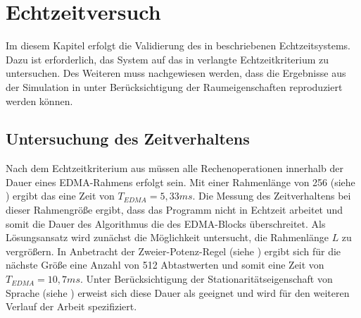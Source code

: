 \chapter{Echtzeitversuch}
\label{chap:Echtzeitversuch}
Im diesem Kapitel erfolgt die Validierung des in  beschriebenen Echtzeitsystems. Dazu ist erforderlich, das System auf das in  verlangte Echtzeitkriterium zu untersuchen. Des Weiteren muss nachgewiesen werden, dass die Ergebnisse aus der Simulation in  unter Berücksichtigung der Raumeigenschaften reproduziert werden können.



\section{Untersuchung des Zeitverhaltens}
\label{sec:UntersuchungZeitverhalten}
Nach dem Echtzeitkriterium aus  müssen alle Rechenoperationen innerhalb der Dauer eines EDMA-Rahmens erfolgt sein. Mit einer Rahmenlänge von 256 (siehe ) ergibt das eine Zeit von $T_{EDMA} = 5,33ms$. Die Messung des Zeitverhaltens bei dieser Rahmengröße ergibt, dass das Programm nicht in Echtzeit arbeitet und somit die Dauer des Algorithmus die des EDMA-Blocks überschreitet. Als Lösungsansatz wird zunächst die Möglichkeit untersucht, die Rahmenlänge $L$ zu vergrößern. In Anbetracht der Zweier-Potenz-Regel (siehe ) ergibt sich für die nächste Größe eine Anzahl von 512 Abtastwerten und somit eine Zeit von $T_{EDMA} = 10,7ms$. Unter Berücksichtigung der Stationaritätseigenschaft von Sprache (siehe ) erweist sich diese Dauer als geeignet und wird für den weiteren Verlauf der Arbeit spezifiziert.

